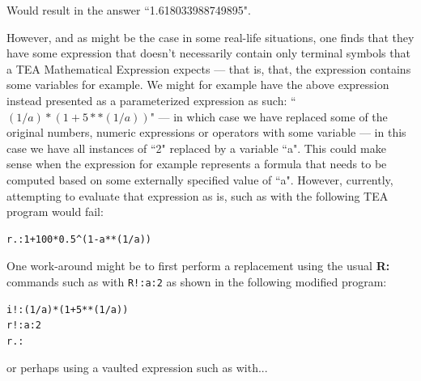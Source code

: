 \documentclass[a4paper, 18pt]{book} %
\begin{document}
{{{Would result in the answer ``1.618033988749895".

\vspace{2em}

However, and as might be the case in some real-life situations, one finds that they have some expression that doesn't necessarily contain only terminal symbols that a TEA Mathematical Expression expects --- that is, that, the expression contains some variables for example. We might for example have the above expression instead presented as a parameterized expression as such: ``$(1/a)*(1+5**(1/a))$" --- in which case we have replaced some of the original numbers, numeric expressions or operators with some variable --- in this case we have all instances of ``2" replaced by a variable ``a". This could make sense when the expression for example represents a formula that needs to be computed based on some externally specified value of ``a". However, currently, attempting to evaluate that expression as is, such as with the following TEA program would fail:

\vspace{1em}

  \begin{tcolorbox}[teaterminalstyle, title=R: EXAMPLE 7: Using R.:, breakable]
  \begin{lstlisting}[language=TEA,breaklines=true,]
r.:1+100*0.5^(1-a**(1/a))
   \end{lstlisting}
  \end{tcolorbox}

\vspace{1em}

One work-around might be to first perform a replacement using the usual \textbf{R:} commands such as with \texttt{R!:a:2} as shown in the following modified program:

\vspace{1em}

  \begin{tcolorbox}[teaterminalstyle, title=R: EXAMPLE 8: Using R.:, breakable]
  \begin{lstlisting}[language=TEA,breaklines=true,]
i!:(1/a)*(1+5**(1/a))
r!:a:2
r.:
   \end{lstlisting}
  \end{tcolorbox}

\vspace{1em}

or perhaps using a vaulted expression such as with...


\vspace{1em}

}}}
\end{document}
